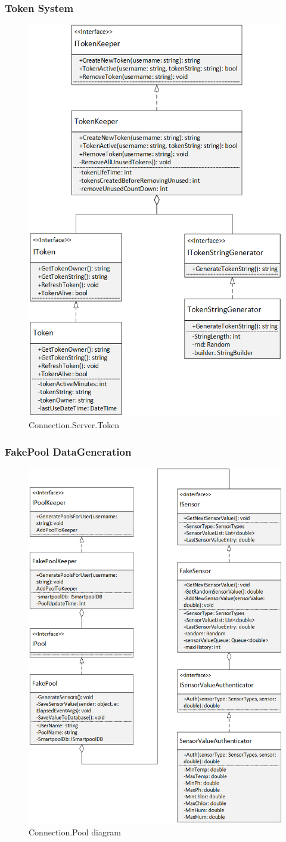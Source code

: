 \subsubsection{Token System}
\begin{figure}
	\centering
	\includegraphics[width=0.7\linewidth]{figs/connection/ConnectionServerToken.png}
	\caption{Connection.Server.Token}
	\label{fig:ConnectionServerToken}
\end{figure}
\subsubsection{FakePool DataGeneration}
\begin{figure}
	\centering
	\includegraphics[width=0.7\linewidth]{figs/connection/ConnectionPool.png}
	\caption{Connection.Pool diagram}
	\label{fig:ConnectionPool}
\end{figure}
